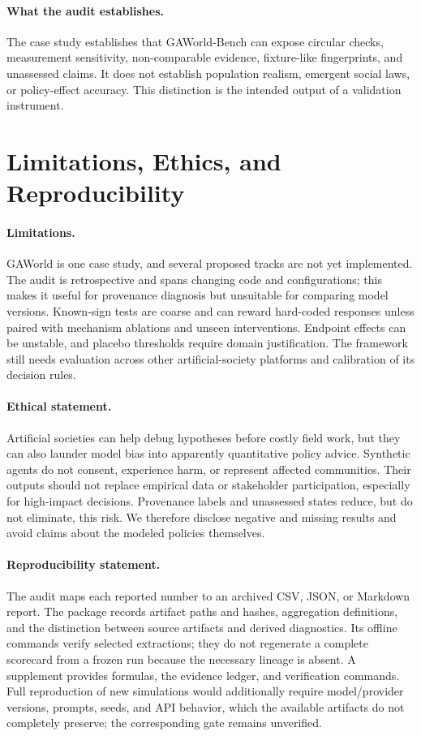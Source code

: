 \documentclass[letterpaper]{article}
\begin{document}
\paragraph{What the audit establishes.}
The case study establishes that GAWorld-Bench can expose circular checks, measurement sensitivity,
non-comparable evidence, fixture-like fingerprints, and unassessed claims. It does not establish population
realism, emergent social laws, or policy-effect accuracy. This distinction is the intended output of a
validation instrument.

\section{Limitations, Ethics, and Reproducibility}

\paragraph{Limitations.}
GAWorld is one case study, and several proposed tracks are not yet implemented. The audit is
retrospective and spans changing code and configurations; this makes it useful for provenance diagnosis
but unsuitable for comparing model versions. Known-sign tests are coarse and can reward hard-coded
responses unless paired with mechanism ablations and unseen interventions. Endpoint effects can be
unstable, and placebo thresholds require domain justification. The framework still needs evaluation
across other artificial-society platforms and calibration of its decision rules.

\paragraph{Ethical statement.}
Artificial societies can help debug hypotheses before costly field work, but they can also launder model
bias into apparently quantitative policy advice. Synthetic agents do not consent, experience harm, or
represent affected communities. Their outputs should not replace empirical data or stakeholder
participation, especially for high-impact decisions. Provenance labels and unassessed states reduce, but
do not eliminate, this risk. We therefore disclose negative and missing results and avoid claims about the
modeled policies themselves.

\paragraph{Reproducibility statement.}
The audit maps each reported number to an archived CSV, JSON, or Markdown report. The package records
artifact paths and hashes, aggregation definitions, and the distinction between source artifacts and
derived diagnostics. Its offline commands verify selected extractions; they do not regenerate a complete
scorecard from a frozen run because the necessary lineage is absent. A supplement provides formulas,
the evidence ledger, and verification commands. Full reproduction of new
simulations would additionally require model/provider versions, prompts, seeds, and API behavior, which
the available artifacts do not completely preserve; the corresponding gate remains unverified.
\end{document}
